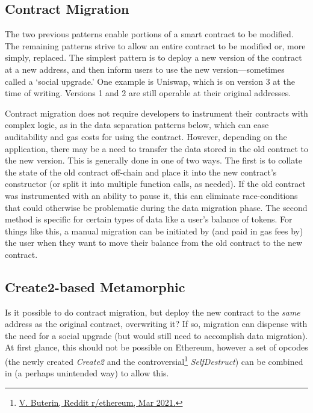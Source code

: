 
\subsection{Contract Migration}
\label{sec:migration}

The two previous patterns enable portions of a smart contract to be modified. The remaining patterns strive to allow an entire contract to be modified or, more simply, replaced. The simplest pattern is to deploy a new version of the contract at a new address, and then inform users to use the new version---sometimes called a `social upgrade.' One example is Uniswap, which is on version 3 at the time of writing. Versions 1 and 2 are still operable at their original addresses. 

Contract migration does not require developers to instrument their contracts with complex logic, as in the data separation patterns below, which can ease auditability and gas costs for using the contract. However, depending on the application, there may be a need to transfer the data stored in the old contract to the new version. This is generally done in one of two ways. The first is to collate the state of the old contract off-chain and place it into the new contract's constructor (or split it into multiple function calls, as needed). If the old contract was instrumented with an ability to pause it, this can eliminate race-conditions that could otherwise be problematic during the data migration phase. The second method is specific for certain types of data like a user's balance of tokens. For things like this, a manual migration can be initiated by (and paid in gas fees by) the user when they want to move their balance from the old contract to the new contract.  
 


\subsection{Create2-based Metamorphic}
\label{sec:metamorphic}

Is it possible to do contract migration, but deploy the new contract to the \textit{same} address as the original contract, overwriting it? If so, migration can dispense with the need for a social upgrade (but would still need to accomplish data migration). At first glance, this should not be possible on Ethereum, however a set of opcodes (the newly created \textit{Create2} and the controversial\footnote{\href{https://www.reddit.com/r/ethereum/comments/lx32kv/expectations\_for\_backwardsincompatible\_changes/}{V. Buterin, Reddit r/ethereum, Mar 2021.}} \textit{SelfDestruct}) can be combined in (a perhaps unintended way) to allow this. 

